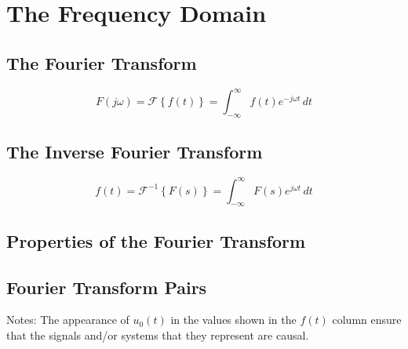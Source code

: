 \section*{The Frequency Domain}

\subsection*{The Fourier Transform}

$$
F(j\omega) = \mathcal{F}\left\{f(t)\right\} = \int_{-\infty}^{\infty} f(t)e^{-j\omega t}\,dt
$$

\subsection*{The Inverse Fourier Transform}

$$
f(t) = \mathcal{F}^{-1}\left\{F(s)\right\} = \int_{-\infty}^{\infty} F(s)e^{j\omega t}\,dt
$$


\subsection*{Properties of the Fourier Transform}



\subsection*{Fourier Transform Pairs}



Notes: The appearance of $u_0(t)$ in the values shown in the $f(t)$ column ensure that 
the signals and/or systems that they represent are causal.
    
\endinput
